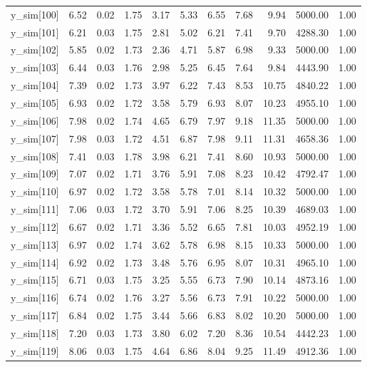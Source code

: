 \begin{table}[ht]
\begin{tabular}{rrrrrrrrrrr}
  y\_sim[100] & 6.52 & 0.02 & 1.75 & 3.17 & 5.33 & 6.55 & 7.68 & 9.94 & 5000.00 & 1.00 \\ 
  y\_sim[101] & 6.21 & 0.03 & 1.75 & 2.81 & 5.02 & 6.21 & 7.41 & 9.70 & 4288.30 & 1.00 \\ 
  y\_sim[102] & 5.85 & 0.02 & 1.73 & 2.36 & 4.71 & 5.87 & 6.98 & 9.33 & 5000.00 & 1.00 \\ 
  y\_sim[103] & 6.44 & 0.03 & 1.76 & 2.98 & 5.25 & 6.45 & 7.64 & 9.84 & 4443.90 & 1.00 \\ 
  y\_sim[104] & 7.39 & 0.02 & 1.73 & 3.97 & 6.22 & 7.43 & 8.53 & 10.75 & 4840.22 & 1.00 \\ 
  y\_sim[105] & 6.93 & 0.02 & 1.72 & 3.58 & 5.79 & 6.93 & 8.07 & 10.23 & 4955.10 & 1.00 \\ 
  y\_sim[106] & 7.98 & 0.02 & 1.74 & 4.65 & 6.79 & 7.97 & 9.18 & 11.35 & 5000.00 & 1.00 \\ 
  y\_sim[107] & 7.98 & 0.03 & 1.72 & 4.51 & 6.87 & 7.98 & 9.11 & 11.31 & 4658.36 & 1.00 \\ 
  y\_sim[108] & 7.41 & 0.03 & 1.78 & 3.98 & 6.21 & 7.41 & 8.60 & 10.93 & 5000.00 & 1.00 \\ 
  y\_sim[109] & 7.07 & 0.02 & 1.71 & 3.76 & 5.91 & 7.08 & 8.23 & 10.42 & 4792.47 & 1.00 \\ 
  y\_sim[110] & 6.97 & 0.02 & 1.72 & 3.58 & 5.78 & 7.01 & 8.14 & 10.32 & 5000.00 & 1.00 \\ 
  y\_sim[111] & 7.06 & 0.03 & 1.72 & 3.70 & 5.91 & 7.06 & 8.25 & 10.39 & 4689.03 & 1.00 \\ 
  y\_sim[112] & 6.67 & 0.02 & 1.71 & 3.36 & 5.52 & 6.65 & 7.81 & 10.03 & 4952.19 & 1.00 \\ 
  y\_sim[113] & 6.97 & 0.02 & 1.74 & 3.62 & 5.78 & 6.98 & 8.15 & 10.33 & 5000.00 & 1.00 \\ 
  y\_sim[114] & 6.92 & 0.02 & 1.73 & 3.48 & 5.76 & 6.95 & 8.07 & 10.31 & 4965.10 & 1.00 \\ 
  y\_sim[115] & 6.71 & 0.03 & 1.75 & 3.25 & 5.55 & 6.73 & 7.90 & 10.14 & 4873.16 & 1.00 \\ 
  y\_sim[116] & 6.74 & 0.02 & 1.76 & 3.27 & 5.56 & 6.73 & 7.91 & 10.22 & 5000.00 & 1.00 \\ 
  y\_sim[117] & 6.84 & 0.02 & 1.75 & 3.44 & 5.66 & 6.83 & 8.02 & 10.20 & 5000.00 & 1.00 \\ 
  y\_sim[118] & 7.20 & 0.03 & 1.73 & 3.80 & 6.02 & 7.20 & 8.36 & 10.54 & 4442.23 & 1.00 \\ 
  y\_sim[119] & 8.06 & 0.03 & 1.75 & 4.64 & 6.86 & 8.04 & 9.25 & 11.49 & 4912.36 & 1.00 \\ 

\end{tabular}
\end{table}
